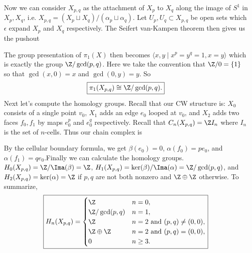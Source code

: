 \documentclass[11pt,letterpaper]{article}
\begin{document}
\begin{solution}
    \quad Now we can consider $X_{p,q}$ as the attachment of $X_{p}$ to $X_q$ along the image of $S^1$ in $X_p, X_q$, i.e. $X_{p,q}=(X_p\sqcup X_q) / (\alpha_p \sqcup \alpha_q)$. Let $U_p, U_q \subset X_{p,q}$ be open sets which $\epsilon$ expand $X_p$ and $X_q$ respectively. The Seifert van-Kampen theorem then gives us the pushout
    \begin{center}
    \end{center}
    \quad The group presentation of $\pi_1(X)$ then becomes $\big\langle x,y \mid x^p=y^q=1, x=y \big\rangle$ which is exactly the group $\Z /\gcd(p,q)$. Here we take the convention that $\Z /0=\{1\}$ so that $\gcd(x,0)=x$ and $\gcd(0,y)=y$. So
    \[
        \boxed{\pi_1(X_{p,q})\cong \Z / \gcd(p,q).}
    \] 
    \quad Next let's compute the homology groups. Recall that our CW structure is: $X_0$ consists of a single point $v_0$, $X_1$ adds an edge $e_0$ looped at $v_0$, and $X_2$ adds two faces $f_0, f_1$ by maps $e_0^p$ and $e_0^q$ respectively. Recall that $C_n(X_{p,q})=\Z I_n$ where $I_n$ is the set of $n$-cells. Thus our chain complex is
    \begin{center}
    \end{center}
    By the cellular boundary formula, we get $\beta(e_0)=0$, $\alpha(f_0)=pe_0$, and $\alpha(f_1)=qe_0$.Finally we can calculate the homology groups. $H_0(X_{p,q})=\Z /\Ima(\beta) = \Z$, $H_1(X_{p,q})=\ker(\beta) / \Ima(\alpha) = \Z /\gcd(p,q)$, and $H_2(X_{p,q})=\ker(\alpha)=\Z$ if $p,q$ are not both nonzero and $\Z\oplus \Z$ otherwise. To summarize,
    \[
        \boxed{H_n(X_{p,q})=\begin{cases}
            \Z & n=0,\\
            \Z /\gcd(p,q) & n=1,\\
            \Z & n=2\text{ and } (p,q)\neq (0,0),\\
            \Z\oplus \Z & n=2\text{ and } (p,q)=(0,0),\\
            0 & n\geq 3.
        \end{cases}}
    \]   
\end{solution}
\end{document}
